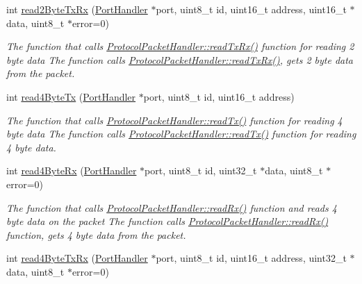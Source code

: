 \begin{DoxyCompactItemize}
int \hyperlink{classmercury_1_1_protocol_packet_handler_a13f3aa6d39e6ac6dd2af0dbcfabe2bd2}{read2\+Byte\+Tx\+Rx} (\hyperlink{classmercury_1_1_port_handler}{Port\+Handler} $\ast$port, uint8\+\_\+t id, uint16\+\_\+t address, uint16\+\_\+t $\ast$data, uint8\+\_\+t $\ast$error=0)
\begin{DoxyCompactList}\small\item\em The function that calls \hyperlink{classmercury_1_1_protocol_packet_handler_a368325ca9c0c783b1e88ef32a4544e51}{Protocol\+Packet\+Handler\+::read\+Tx\+Rx()} function for reading 2 byte data  The function calls \hyperlink{classmercury_1_1_protocol_packet_handler_a368325ca9c0c783b1e88ef32a4544e51}{Protocol\+Packet\+Handler\+::read\+Tx\+Rx()},  gets 2 byte data from the packet. \end{DoxyCompactList}\item 
int \hyperlink{classmercury_1_1_protocol_packet_handler_a54aca6764cfb0cfcc6069557645f18a7}{read4\+Byte\+Tx} (\hyperlink{classmercury_1_1_port_handler}{Port\+Handler} $\ast$port, uint8\+\_\+t id, uint16\+\_\+t address)
\begin{DoxyCompactList}\small\item\em The function that calls \hyperlink{classmercury_1_1_protocol_packet_handler_aebb2c28d6b3f2e87c7a56b757a24810b}{Protocol\+Packet\+Handler\+::read\+Tx()} function for reading 4 byte data  The function calls \hyperlink{classmercury_1_1_protocol_packet_handler_aebb2c28d6b3f2e87c7a56b757a24810b}{Protocol\+Packet\+Handler\+::read\+Tx()} function for reading 4 byte data. \end{DoxyCompactList}\item 
int \hyperlink{classmercury_1_1_protocol_packet_handler_ae130d40309fcbc0302274a13fd40830b}{read4\+Byte\+Rx} (\hyperlink{classmercury_1_1_port_handler}{Port\+Handler} $\ast$port, uint8\+\_\+t id, uint32\+\_\+t $\ast$data, uint8\+\_\+t $\ast$error=0)
\begin{DoxyCompactList}\small\item\em The function that calls \hyperlink{classmercury_1_1_protocol_packet_handler_af7ff32d0eca6395b92bf7efc02118a27}{Protocol\+Packet\+Handler\+::read\+Rx()} function and reads 4 byte data on the packet  The function calls \hyperlink{classmercury_1_1_protocol_packet_handler_af7ff32d0eca6395b92bf7efc02118a27}{Protocol\+Packet\+Handler\+::read\+Rx()} function,  gets 4 byte data from the packet. \end{DoxyCompactList}\item 
int \hyperlink{classmercury_1_1_protocol_packet_handler_ac8d351474e574501137c3ac02fe64fdc}{read4\+Byte\+Tx\+Rx} (\hyperlink{classmercury_1_1_port_handler}{Port\+Handler} $\ast$port, uint8\+\_\+t id, uint16\+\_\+t address, uint32\+\_\+t $\ast$data, uint8\+\_\+t $\ast$error=0)

\end{DoxyCompactItemize}
